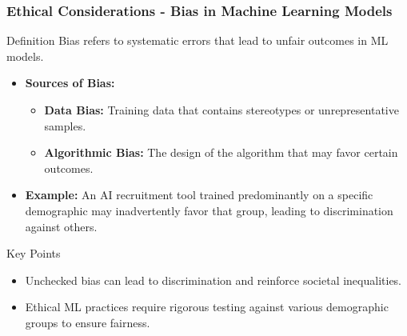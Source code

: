 \documentclass[aspectratio=169]{beamer}
\begin{document}
\begin{frame}[fragile]
    \frametitle{Ethical Considerations - Bias in Machine Learning Models}
    \begin{block}{Definition}
        Bias refers to systematic errors that lead to unfair outcomes in ML models.
    \end{block}
    
    \begin{itemize}
        \item \textbf{Sources of Bias:}
        \begin{itemize}
            \item \textbf{Data Bias:} Training data that contains stereotypes or unrepresentative samples.
            \item \textbf{Algorithmic Bias:} The design of the algorithm that may favor certain outcomes.
        \end{itemize}
        
        \item \textbf{Example:} An AI recruitment tool trained predominantly on a specific demographic may inadvertently favor that group, leading to discrimination against others.
    \end{itemize}

    \begin{block}{Key Points}
        \begin{itemize}
            \item Unchecked bias can lead to discrimination and reinforce societal inequalities.
            \item Ethical ML practices require rigorous testing against various demographic groups to ensure fairness.
        \end{itemize}
    \end{block}
\end{frame}
\end{document}
